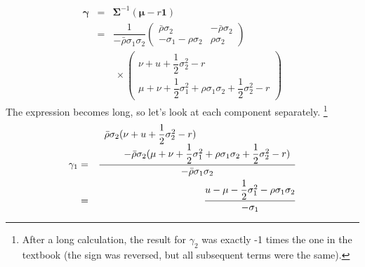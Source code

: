 \documentclass[uplatex,a4j,12pt,dvipdfmx]{jsarticle}
\begin{document}
%
%
\begin{eqnarray*}
	{\bm \gamma}
	&=&
	{\bm \Sigma}^{-1}
	( {\bm \mu} - r {\bm 1} )
	\\ &=&
	\dfrac{1}{ - \bar{\rho} \sigma_{1} \sigma_{2} }
	\left(
	\!\!
	\begin{array}{cc}
			\bar{\rho} \sigma_{2}          & - \bar{\rho} \sigma_{2}
			\\
			- \sigma_{1} - \rho \sigma_{2} & \rho \sigma_{2}
		\end{array}
	\!\!
	\right)
	\\ && \ \times
	\left(
	\begin{array}{c}
			\nu + u + \dfrac{1}{2} \sigma_{2}^{2} - r
			\\
			\mu + \nu + \dfrac{1}{2} \sigma_{1}^{2} + \rho \sigma_{1} \sigma_{2} + \dfrac{1}{2} \sigma_{2}^{2} - r
		\end{array}
	\right)
\end{eqnarray*}
%
%
The expression becomes long, so let's look at each component separately.
\footnote{
	After a long calculation, the result for $\gamma_{2}$ was exactly -1 times the one in the textbook (the sign was reversed, but all subsequent terms were the same).
}
%
%
\begin{eqnarray*}
	\gamma_{1}
	&=&
	\dfrac{
		\begin{array}{l}
			\bar{\rho} \sigma_{2}
			( \nu + u + \dfrac{1}{2} \sigma_{2}^{2} - r )
			\\ \hspace{7mm}
			- \bar{\rho} \sigma_{2}
			( \mu + \nu + \dfrac{1}{2} \sigma_{1}^{2} + \rho \sigma_{1} \sigma_{2} + \dfrac{1}{2} \sigma_{2}^{2} - r )
		\end{array}
	}
	{ - \bar{\rho} \sigma_{1} \sigma_{2} }
	\\ &=&
	\dfrac{
		u
		-
		\mu - \dfrac{1}{2} \sigma_{1}^{2} - \rho \sigma_{1} \sigma_{2}
	}
	{ - \sigma_{1} }
\end{eqnarray*}
%
%
\end{document}
